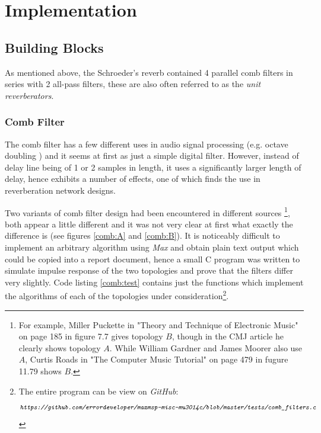 \documentclass[12pt]{report}
\newcommand{\URL}[1]{\[ \texttt{\emph{#1}} \]}
\newcommand{\href}[2]{#2 (\texttt{\emph{\url{#1}}})} %
\newcommand{\Href}[2]{{#2}} %
\newcommand{\Href}[2]{\href{#1}{#2}} %
\newcommand{\URL}[1]{\[ \Href{#1}{\texttt{\emph{#1}}} \]}
\begin{document}
\section{Implementation}

  \subsection{Building Blocks}
  As mentioned above, the Schroeder's reverb contained 4 parallel comb filters
  in series with 2 all-pass filters, these are also often referred to as the
  \emph{unit reverberators}.

  \subsubsection{Comb Filter}
  The comb filter has a few different uses in audio signal processing (e.g.
  octave doubling \cite{puckette2007theory}) and it seems at first as just
  a simple digital filter. However, instead of delay line being of 1 or 2
  samples in length, it uses a significantly larger length of delay, hence
  exhibits a number of effects, one of which finds the use in reverberation
  network designs.

  Two variants of comb filter design had been encountered in different sources%
  \footnote{For example, Miller Puckette in "Theory and Technique of Electronic
  Music" \cite{puckette2007theory} on page 185 in figure 7.7 gives topology $B$,
  though in the CMJ article \cite{puckette1982reverb} he clearly shows topology
  $A$. While William Gardner \cite{gardner1998algorithms, gardner1992virtual}
  and James Moorer also use $A$, Curtis Roads in "The Computer Music Tutorial"%
  \cite{roads1996computer} on page 479 in fugure 11.79 shows $B$.},
  both appear a little different and it was not very clear at first
  what exactly the difference is (see figures \ref{comb:A} and \ref{comb:B}).
  It is noticeably difficult to implement an arbitrary algorithm using \emph{Max}
  and obtain plain text output which could be copied into a report document,
  hence a small C program was written to simulate impulse response of the two
  topologies and prove that the filters differ very slightly. Code listing
  \ref{comb:test} contains just the functions which implement the algorithms of
  each of the topologies under consideration\footnote{The entire program can be
  view on \emph{GitHub}:
  \URL{https://github.com/errordeveloper/maxmsp-misc-mu3014c/blob/master/tests/comb\_filters.c}}.
\end{document}
